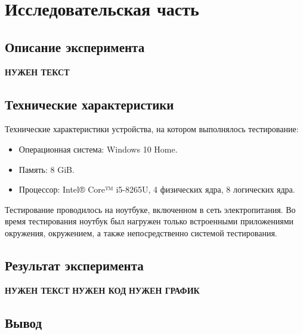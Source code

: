 \chapter{Исследовательская часть}

\section{Описание эксперимента}

\textbf{НУЖЕН ТЕКСТ}

\section{Технические характеристики}

Технические характеристики устройства, на котором выполнялось тестирование:

\begin{itemize}
	\item Операционная система: Windows 10 Home\cite{win}.
	\item Память: 8 GiB.
    \item Процессор: Intel® Core™ i5-8265U, 4 физических ядра, 8 логических
        ядра\cite{intel}.
\end{itemize}

Тестирование проводилось на ноутбуке, включенном в сеть электропитания. Во
время тестирования ноутбук был нагружен только встроенными приложениями
окружения, окружением, а также непосредственно системой тестирования.

\section{Результат эксперимента}

\textbf{НУЖЕН ТЕКСТ}
\textbf{НУЖЕН КОД}
\textbf{НУЖЕН ГРАФИК}

\section*{Вывод}
